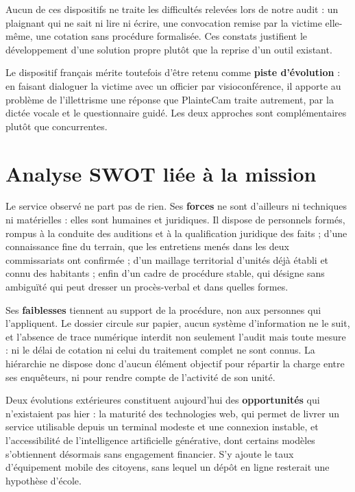 Aucun de ces dispositifs ne traite les difficultés relevées lors de notre audit : un plaignant qui ne sait ni lire ni écrire, une convocation remise par la victime elle-même, une cotation sans procédure formalisée. Ces constats justifient le développement d'une solution propre plutôt que la reprise d'un outil existant.

Le dispositif français mérite toutefois d'être retenu comme \textbf{piste d'évolution} : en faisant dialoguer la victime avec un officier par visioconférence, il apporte au problème de l'illettrisme une réponse que PlainteCam traite autrement, par la dictée vocale et le questionnaire guidé. Les deux approches sont complémentaires plutôt que concurrentes.

\section{Analyse SWOT liée à la mission}

Le service observé ne part pas de rien. Ses \textbf{forces} ne sont d'ailleurs ni techniques ni matérielles : elles sont humaines et juridiques. Il dispose de personnels formés, rompus à la conduite des auditions et à la qualification juridique des faits ; d'une connaissance fine du terrain, que les entretiens menés dans les deux commissariats ont confirmée ; d'un maillage territorial d'unités déjà établi et connu des habitants ; enfin d'un cadre de procédure stable, qui désigne sans ambiguïté qui peut dresser un procès-verbal et dans quelles formes.

Ses \textbf{faiblesses} tiennent au support de la procédure, non aux personnes qui l'appliquent. Le dossier circule sur papier, aucun système d'information ne le suit, et l'absence de trace numérique interdit non seulement l'audit mais toute mesure : ni le délai de cotation ni celui du traitement complet ne sont connus. La hiérarchie ne dispose donc d'aucun élément objectif pour répartir la charge entre ses enquêteurs, ni pour rendre compte de l'activité de son unité.

Deux évolutions extérieures constituent aujourd'hui des \textbf{opportunités} qui n'existaient pas hier : la maturité des technologies web, qui permet de livrer un service utilisable depuis un terminal modeste et une connexion instable, et l'accessibilité de l'intelligence artificielle générative, dont certains modèles s'obtiennent désormais sans engagement financier. S'y ajoute le taux d'équipement mobile des citoyens, sans lequel un dépôt en ligne resterait une hypothèse d'école.


